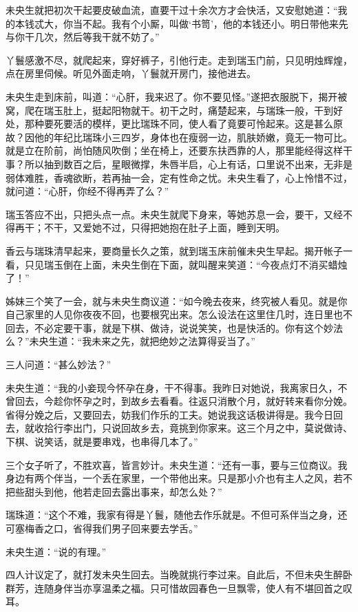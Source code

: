 \documentclass[a4paper,12pt,UTF8,twoside]{ctexbook}
\begin{document}
未央生就把初次干起要皮破血流，直要干过十余次方才会快活，又安慰她道：“我的本钱忒大，你当不起。我有个小厮，叫做‘书笥’，他的本钱还小。明日带他来先与你干几次，然后等我干就不妨了。”

丫鬟感激不尽，就爬起来，穿好裤子，引他行走。走到瑞玉门前，只见明烛辉煌，点在房里伺候。听见外面走响，丫鬟就开房门，接他进去。

未央生走到床前，叫道：“心肝，我来迟了。你不要见怪。”遂把衣服脱下，揭开被窝，爬在瑞玉肚上，挺起阳物就干。初干之时，痛楚起来，与瑞珠一般，干到好处，那种要死要活的模样，更比瑞珠不同，使人看了竟要可怜起来。这是甚么原故？因他的年纪比瑞珠小三四岁，身体也在瘦弱一边，肌肤娇嫩，竟无一物可比。就是立在阶前，尚怕随风吹倒；坐在椅上，还要东扶西靠的人，那里能经得这样干事？所以抽到数百之后，星眼微撑，朱唇半启，心上有话，口里说不出来，无非是弱体难胜，香魂欲断，若再抽一会，定有性命之忧。未央生看了，心上怜惜不过，就问道：“心肝，你经不得再弄了么？”

瑞玉答应不出，只把头点一点。未央生就爬下身来，等她苏息一会，要干，又经不得再干；不干，又爱她不过，只得把她抱在肚子上面，睡到天明。

香云与瑞珠清早起来，要商量长久之策，就到瑞玉床前催未央生早起。揭开帐子一看，只见瑞玉倒在上面，未央生倒在下面，就叫醒来笑道：“今夜点灯不消买蜡烛了！”

姊妹三个笑了一会，就与未央生商议道：“如今晚去夜来，终究被人看见。就是你自己家里的人见你夜夜不回，也要根究出来。怎么设法在这里住几时，连日里也不回去，不必定要干事，就是下棋、做诗，说说笑笑，也是快活的。你有这个妙法么？”未央生道：“我未来之先，就把绝妙之法算得妥当了。”

三人问道：“甚么妙法？”

未央生道：“我的小妾现今怀孕在身，干不得事。我昨日对她说，我离家日久，不曾回去，今趁你怀孕之时，到故乡去看看。往返只消散个月，就好转来看你分娩。省得分娩之后，又要回去，妨我们作乐的工夫。她说我这话极讲得是。我今日回去，就收拾行李出门，只说回故乡去，竟挑到你家来。这三个月之中，莫说做诗、下棋、说笑话，就是要串戏，也串得几本了。”

三个女子听了，不胜欢喜，皆言妙计。未央生道：“还有一事，要与三位商议。我身边有两个伴当，一个丢在家里，一个带他出来。只是那小介也有主人之风，若不把些甜头到他，他若走回去露出事来，却怎么处？”

瑞珠道：“这个不难，我家有得是丫鬟，随他去作乐就是。不但可系伴当之身，还可塞梅香之口，省得我们男子回来要去学舌。”

未央生道：“说的有理。”

四人计议定了，就打发未央生回去。当晚就挑行李过来。自此后，不但未央生醉卧群芳，连随身伴当亦享温柔之福。只可惜故园春色一旦飘零，使人有不堪回首之叹耳。
\end{document}
